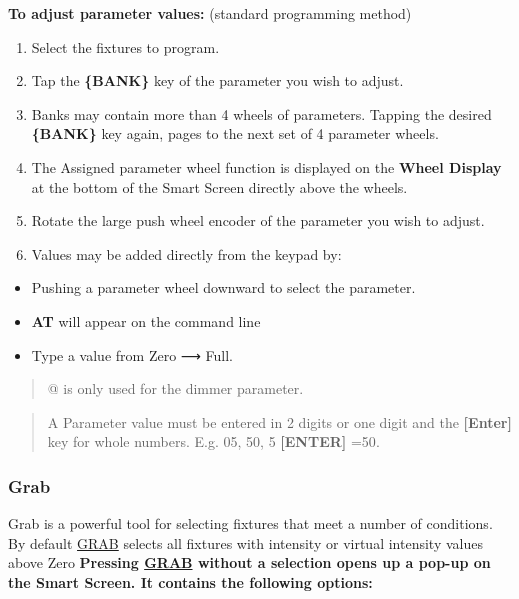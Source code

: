 \documentclass[
]{article}
\begin{document}
\textbf{To adjust parameter values:} (standard programming method)

\begin{enumerate}
\def\labelenumi{\arabic{enumi}.}
\item
  Select the fixtures to program.
\item
  Tap the \textbf{\{BANK\}} key of the parameter you wish to adjust.
\item
  Banks may contain more than 4 wheels of parameters. Tapping the desired \textbf{\{BANK\}} key again, pages to the next set of 4 parameter wheels.
\item
  The Assigned parameter wheel function is displayed on the \textbf{Wheel Display} at the bottom of the Smart Screen directly above the wheels.
\item
  Rotate the large push wheel encoder of the parameter you wish to adjust.
\item
  Values may be added directly from the keypad by:
\end{enumerate}

\begin{itemize}
\item
  Pushing a parameter wheel downward to select the parameter.
\item
  \textbf{AT} will appear on the command line
\item
  Type a value from Zero ⟶ Full.
\end{itemize}

\begin{quote}
{@ is only used for the dimmer parameter}.
\end{quote}

\begin{quote}
{A Parameter value must be entered in 2 digits or one digit and the \textbf{{[}Enter{]}} key for whole numbers. E.g. 05, 50, 5 \textbf{{[}ENTER{]}} =50}.
\end{quote}

\hypertarget{grab}{%
\subsubsection{Grab}\label{grab}}

Grab is a powerful tool for selecting fixtures that meet a number of conditions. By default \protect\hyperlink{grab}{GRAB} selects all fixtures with intensity or virtual intensity values above Zero \textbf{Pressing \protect\hyperlink{grab}{GRAB} without a selection opens up a pop-up on the Smart Screen. It contains the following options:}
\end{document}
